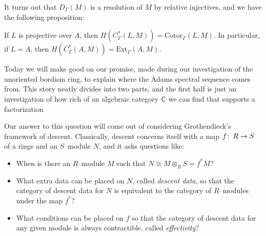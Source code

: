 It turns out that $ D_{\Gamma}(M)$ is a resolution of $ M$ by relative injectives, and we have the following proposition:

\begin{proposition}
If $ L$ is projective over $ A$, then $ H(C_{\Gamma}^*(L, M)) = \text{Cotor}_{\Gamma}(L, M)$.  In particular, if $ L = A$, then $ H(C_{\Gamma}^*(A, M)) = \text{Ext}_{\Gamma}(A, M)$.
\end{proposition}

Today we will make good on our promise, made during our investigation of the unoriented bordism ring, to explain where the Adams spectral sequence comes from.  This story neatly divides into two parts, and the first half is just an investigation of how rich of an algebraic category $\mathsf{C}$ we can find that supports a factorization
\begin{center}
\end{center}
Our answer to this question will come out of considering Grothendieck's framework of descent.  Classically, descent concerns itself with a map $f\colon\thinspace R \to S$ of a rings and an $S$--module $N$, and it asks questions like:
\begin{itemize}
\item When is there an $R$--module $M$ such that $N \cong M \otimes_R S = f^* M$?
\item What extra data can be placed on $N$, called \textit{descent data}, so that the category of descent data for $N$ is equivalent to the category of $R$--modules under the map $f^*$? 
\item What conditions can be placed on $f$ so that the category of descent data for any given module is always contractible, called \textit{effectivity}?
\end{itemize}

